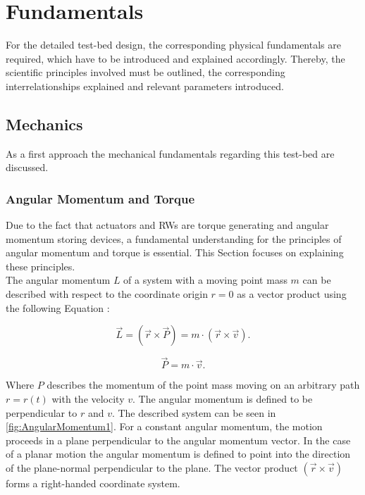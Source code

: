 \chapter{Fundamentals}
\label{chap:Fundamentals}
For the detailed test-bed design, the corresponding physical fundamentals are required, which have to be introduced and explained accordingly. Thereby, the scientific principles involved must be outlined, the corresponding interrelationships explained and relevant parameters introduced.


\section{Mechanics}
As a first approach the mechanical fundamentals regarding this test-bed are discussed.
\label{sec:mechanics}
\subsection{Angular Momentum and Torque}
Due to the fact that actuators and RWs are torque generating and angular momentum storing devices, a fundamental understanding for the principles of angular momentum and torque is essential. This Section focuses on explaining these principles.\\


The angular momentum $L$ of a system with a moving point mass $m$ can be described with respect to the coordinate origin $r = 0$ as a vector product using the following Equation \cite{Demtroder.2017}:

\begin{equation}
\vec{L} = ( \vec{r} \times \vec{P} ) = m \cdot ( \vec{r} \times \vec{v}) .
\label{eqn:AngularMomentum}
\end{equation}

\begin{equation}
\vec{P} = m \cdot \vec{v} .
\label{eqn:Momentum}
\end{equation}

Where $P$ describes the momentum of the point mass moving on an arbitrary path $r = r(t)$ with the velocity $v$. The angular momentum is defined to be perpendicular to $r$ and $v$. The described system can be seen in \autoref{fig:AngularMomentum1}. For a constant angular momentum, the motion proceeds in a plane perpendicular to the angular momentum vector. In the case of a planar motion the angular momentum is defined to point into the direction of the plane-normal perpendicular to the plane. The vector product $(\vec{r} \times \vec{v})$ forms a right-handed coordinate system.

